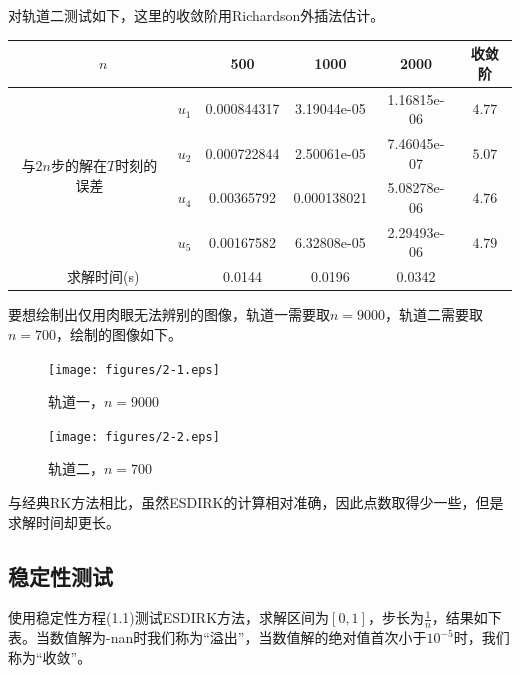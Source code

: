 \documentclass[lang=cn,10pt,bibend=bibtex]{elegantbook}
\begin{document}
对轨道二测试如下，这里的收敛阶用Richardson外插法估计。

\begin{table}[htbp]
  \centering
  \renewcommand\arraystretch{1.1}
  \begin{tabular}{cc|ccc|c}
  \multicolumn{2}{c|}{$n$}                         & 500 & 1000 & 2000  & 收敛阶 \\ \hline
  \multicolumn{1}{c|}{\multirow{4}{*}{与$2n$步的解在$T$时刻的误差}}    & \multicolumn{1}{c|}{$u_1$} & 0.000844317  & 3.19044e-05  & 1.16815e-06   &   $4.77$  \\
  \multicolumn{1}{c|}{}                         & \multicolumn{1}{c|}{$u_2$} &  0.000722844    & 2.50061e-05  & 7.46045e-07   &   $5.07$   \\
  \multicolumn{1}{c|}{}                         & \multicolumn{1}{c|}{$u_4$} &  0.00365792     & 0.000138021  & 5.08278e-06   &   $4.76$ \\
  \multicolumn{1}{c|}{}                         & \multicolumn{1}{c|}{$u_5$} &  0.00167582     & 6.32808e-05  & 2.29493e-06   &   $4.79$  \\ \hline
  \multicolumn{2}{c|}{求解时间(s)} & 0.0144 & 0.0196 & 0.0342  &   
  \end{tabular}
\end{table}

要想绘制出仅用肉眼无法辨别的图像，轨道一需要取$n=9000$，轨道二需要取$n=700$，绘制的图像如下。

\begin{figure}[H]
  \centering
  \begin{minipage}[t]{0.35\linewidth}
      \centering
      \texttt{[image: figures/2-1.eps]}
      \caption*{轨道一，$n=9000$}
  \end{minipage}
  \hspace{2em}
  \begin{minipage}[t]{0.35\linewidth}
      \centering
      \texttt{[image: figures/2-2.eps]}
      \caption*{轨道二，$n=700$}
  \end{minipage}
\end{figure}

与经典RK方法相比，虽然ESDIRK的计算相对准确，因此点数取得少一些，但是求解时间却更长。

\subsection{稳定性测试}

使用稳定性方程(1.1)测试ESDIRK方法，求解区间为$[0,1]$，步长为$\frac{1}{n}$，结果如下表。当数值解为-nan时我们称为“溢出”，当数值解的绝对值首次小于$10^{-5}$时，我们称为“收敛”。
\end{document}
